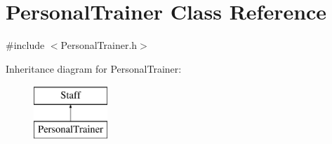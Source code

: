 \hypertarget{classPersonalTrainer}{}\section{Personal\+Trainer Class Reference}
\label{classPersonalTrainer}


{\ttfamily \#include $<$Personal\+Trainer.\+h$>$}

Inheritance diagram for Personal\+Trainer\+:\begin{figure}[H]
\begin{center}
\leavevmode
\includegraphics[height=2.000000cm]{classPersonalTrainer}
\end{center}
\end{figure}
